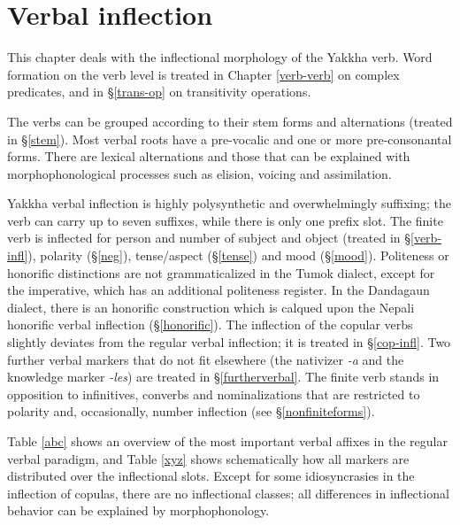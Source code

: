 ﻿\chapter{Verbal inflection}\label{verbalmorph}

This chapter deals with the inflectional morphology of the Yakkha verb. Word formation on the verb level is treated in  Chapter \ref{verb-verb} on complex predicates, and in §\ref{trans-op} on transitivity operations.

The verbs can be grouped according to their stem forms and alternations (treated in §\ref{stem}). Most verbal roots have a pre-vocalic and one or more pre-consonantal  forms. There are lexical alternations and those that can be explained with morphophonological processes such as elision, voicing and assimilation. 

Yakkha verbal inflection is highly polysynthetic and overwhelmingly suffixing; the verb can carry up to seven suffixes, while there is only one prefix slot. The finite verb is  inflected for person and number of subject and object (treated in §\ref{verb-infl}), polarity (§\ref{neg}),  tense/aspect (§\ref{tense}) and  mood (§\ref{mood}). Politeness or honorific distinctions are not grammaticalized in the Tumok dialect, except for the imperative, which has an additional politeness register. In the Dandagaun dialect,  there is an honorific construction which is calqued upon the Nepali honorific verbal inflection  (§\ref{honorific}). The inflection of the copular verbs slightly deviates from the regular verbal inflection; it is treated in §\ref{cop-infl}. Two further verbal markers that do not fit elsewhere (the nativizer \emph{-a} and the knowledge marker \emph{-les})  are treated in §\ref{furtherverbal}. The finite verb stands in opposition to infinitives, converbs and nominalizations that are restricted to polarity and, occasionally, number inflection (see §\ref{nonfiniteforms}). 



Table \ref{abc} shows an overview of the most important verbal affixes in the regular verbal paradigm, and Table \ref{xyz} shows schematically how all  markers are distributed over the inflectional slots. Except for some idiosyncrasies in the inflection of copulas, there are no inflectional classes; all differences in inflectional behavior can be explained by morphophonology. 


